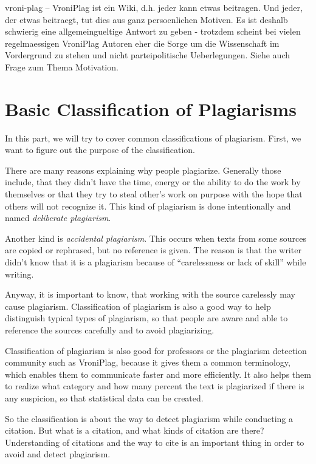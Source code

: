 vroni-plag -- VroniPlag ist ein Wiki, d.h. jeder kann etwas beitragen. Und jeder, der etwas beitraegt, tut dies aus ganz persoenlichen Motiven. Es ist deshalb schwierig eine allgemeingueltige Antwort zu geben - trotzdem scheint bei vielen regelmaessigen VroniPlag Autoren eher die Sorge um die Wissenschaft im Vordergrund zu stehen und nicht parteipolitische Ueberlegungen. Siehe auch Frage zum Thema Motivation. 


\newpage
\section{Basic Classification of Plagiarisms}

In this part, we will try to cover common classifications of plagiarism. First, we want to figure out the purpose of 
the classification. 

There are many reasons explaining why people plagiarize. Generally those include, that they didn't have the time,
energy or the ability to do the work by themselves or that they try to steal other’s work on purpose with the hope that others
will not recognize it. This kind of plagiarism is done intentionally and named \textit{deliberate 
plagiarism}\citep{UEfAP}.

Another kind is \textit{accidental plagiarism}. This occurs when texts from some sources are copied or rephrased, but no 
reference is given. The reason is that the writer didn't know that it is a plagiarism because of \enquote{carelessness or  
lack of skill}\citep{UEfAP} while writing.

Anyway, it is important to know, that working with the source carelessly may cause plagiarism. Classification 
of plagiarism is also a good way to help distinguish typical types of plagiarism, so that people are aware and able 
to reference the sources carefully and to avoid plagiarizing.

Classification of plagiarism is also good for professors or the plagiarism detection community such as VroniPlag, because
it gives them a common terminology, which enables them to communicate faster and more efficiently. 
It also helps them to realize what category and how many percent the text is plagiarized 
if there is any suspicion, so that statistical data can be created.

So the classification is about the way to detect plagiarism while conducting a citation. But what is a citation, and 
what kinds of citation are there? Understanding of citations and the way to cite is an important thing in order to 
avoid and detect plagiarism.

